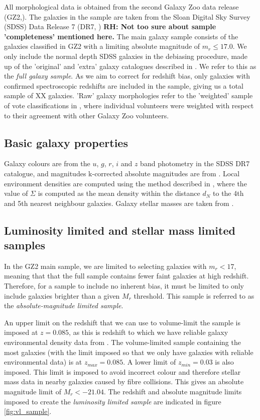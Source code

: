 \documentclass[useAMS,usenatbib]{mn2e}
\newcommand{\rh}[1]{{\bf \textcolor{RoyalPurple}{RH: #1}}}
\begin{document}
All morphological data is obtained from the second Galaxy Zoo data release (GZ2,\citet{Willett_13}). The galaxies in the sample are taken from the Sloan Digital Sky Survey (SDSS) Data Release 7 (DR7, \citet{Abazijian_09}) \rh{Not too sure about sample 'completeness' mentioned here.} The main galaxy sample consists of the galaxies classified in GZ2 with a limiting absolute magnitude of $m_r \leq 17.0$. We only include the normal depth SDSS galaxies in the debiasing procedure, made up of the 'original' and 'extra' galaxy catalogues described in \citep{Willett_13}. We refer to this as the \textit{full galaxy sample}. As we aim to correct for redshift bias, only galaxies with confirmed spectroscopic redshifts are included in the sample, giving us a total sample of XX galaxies. 'Raw' galaxy morphologies refer to the 'weighted' sample of vote classifications in \citep{Willett_13}, where individual volunteers were weighted with respect to their agreement with other Galaxy Zoo volunteers. 

\subsection{Basic galaxy properties}

Galaxy colours are from the $u$, $g$, $r$, $i$ and $z$ band photometry in the SDSS DR7 catalogue, and magnitudes k-corrected absolute magnitudes are from \cite{Bamford_09}. Local environment densities are computed using the method described in \cite{Bamford_09,Baldry_06}, where the value of $\Sigma$ is computed as the mean density within the distance $d_N$ to the 4th and 5th nearest neighbour galaxies. Galaxy stellar masses are taken from \citep{Baldry_06}.

\subsection{Luminosity limited and stellar mass limited samples}
\label{sec:VLS}

In the GZ2 main sample, we are limited to selecting galaxies with $m_r<17$, meaning that that the full sample contains fewer faint galaxies at high redshift. Therefore, for a sample to include no inherent bias, it must be limited to only include galaxies brighter than a given $M_r$ threshold. This sample is referred to as the \textit{absolute-magnitude limited sample}.

An upper limit on the redshift that we can use to volume-limit the sample is imposed at $z=0.085$, as this is redshift to which we have reliable galaxy environmental density data from \cite{Baldry_06}. The volume-limited sample containing the most galaxies (with the limit imposed so that we only have galaxies with reliable environmental data) is at $z_{max}=0.085$. A lower limit of $z_{min}=0.03$ is also imposed. This limit is imposed to avoid incorrect colour and therefore stellar mass data in nearby galaxies caused by fibre collisions. This gives an absolute magnitude limit of $M_r<-21.04$. The redshift and absolute magnitude limits imposed to create the \textit{luminosity limited sample} are indicated in figure \ref{fig:vl_sample}. 
\end{document}

